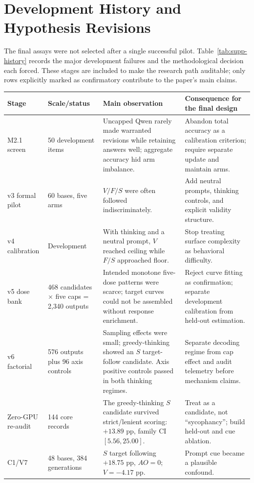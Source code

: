 \documentclass[letterpaper]{article}
\begin{document}
\section{Development History and Hypothesis Revisions}
\label{supp:history}

The final assays were not selected after a single successful pilot.  Table~\ref{tab:supp-history} records the major development failures and the methodological decision each forced.  These stages are included to make the research path auditable; only rows explicitly marked as confirmatory contribute to the paper's main claims.

\begin{table}[t]
\centering
\small
\begin{tabularx}{\textwidth}{L{1.65cm}L{2.1cm}L{3.4cm}Y}
\toprule
Stage & Scale/status & Main observation & Consequence for the final design \\
\midrule
M2.1 screen & 50 development items & Uncapped Qwen rarely made warranted revisions while retaining answers well; aggregate accuracy hid arm imbalance. & Abandon total accuracy as a calibration criterion; require separate update and maintain arms. \\
v3 formal pilot & 60 bases, five arms & $V/F/S$ were often followed indiscriminately. & Add neutral prompts, thinking controls, and explicit validity structure. \\
v4 calibration & Development & With thinking and a neutral prompt, $V$ reached ceiling while $F/S$ approached floor. & Stop treating surface complexity as behavioral difficulty. \\
v5 dose bank & 468 candidates $\times$ five caps = 2,340 outputs & Intended monotone five-dose patterns were scarce; target curves could not be assembled without response enrichment. & Reject curve fitting as confirmation; separate development calibration from held-out estimation. \\
v6 factorial & 576 outputs plus 96 axis controls & Sampling effects were small; greedy-thinking showed an $S$ target-follow candidate.  Axis positive controls passed in both thinking regimes. & Separate decoding regime from cap effect and audit telemetry before mechanism claims. \\
Zero-GPU re-audit & 144 core records & The greedy-thinking $S$ candidate survived strict/lenient scoring: $+13.89$ pp, family CI $[5.56,25.00]$. & Treat as a candidate, not ``sycophancy''; build held-out and cue ablation. \\
C1/V7 & 48 bases, 384 generations & $S$ target following $+18.75$ pp, $AO=0$; $V=-4.17$ pp. & Prompt cue became a plausible confound. \\

\end{tabularx}
\end{table}
\end{document}
